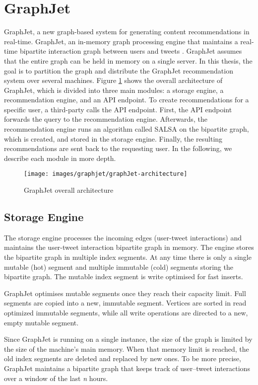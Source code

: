 \section{GraphJet}
\label{GraphJet}
GraphJet, a new graph-based system for generating content recommendations in real-time. GraphJet, an in-memory graph processing engine that maintains a real-time bipartite interaction graph between users and tweets \cite{sharma2016graphjet}. GraphJet assumes that the entire graph can be held in memory on a single server. In this thesis, the goal is to partition the graph and distribute the GraphJet recommendation system over several machines. Figure \ref{fig:graphJet-architecture} shows the overall architecture of GraphJet, which is divided into three main modules: a storage engine, a recommendation engine, and an API endpoint. To create recommendations for a specific user, a third-party calls the API endpoint. First, the API endpoint forwards the query to the recommendation engine. Afterwards, the recommendation engine runs an algorithm called SALSA on the bipartite graph, which is created, and stored in the storage engine. Finally, the resulting recommendations are sent back to the requesting user. In the following, we describe each module in more depth.

\begin{figure}[!h]
	\centering
	\texttt{[image: images/graphjet/graphJet-architecture]}
	\caption{GraphJet overall architecture}
	\label{fig:graphJet-architecture}
\end{figure}


\subsection{Storage Engine}
The storage engine processes the incoming edges (user-tweet interactions) and maintains the user-tweet interaction bipartite graph in memory. The engine stores the bipartite graph in multiple index segments. At any time there is only a single mutable (hot) segment and multiple immutable (cold) segments storing the bipartite graph. The mutable index segment is write optimised for fast inserts. 

GraphJet optimises mutable segments once they reach their capacity limit. Full segments are copied into a new, immutable segment. Vertices are sorted in read optimized immutable segments, while all write operations are directed to a new, empty mutable segment.

Since GraphJet is running on a single instance, the size of the graph is limited by the size of the machine's main memory. When that memory limit is reached, the old index segments are deleted and replaced by new ones. To be more precise, GraphJet maintains a bipartite graph that keeps track of user–tweet interactions over a window of the last \textit{n} hours.

